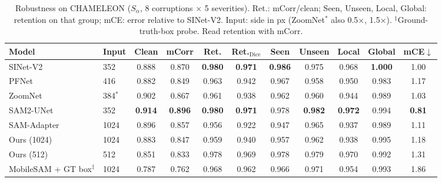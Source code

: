 \begin{table}[t]
\centering
\caption{Robustness on CHAMELEON ($S_\alpha$, 8 corruptions $\times$ 5 severities). Ret.: mCorr/clean; Seen, Unseen, Local, Global: retention on that group; mCE: error relative to SINet-V2. Input: side in px (ZoomNet$^*$ also 0.5$\times$, 1.5$\times$). $^\ddagger$Ground-truth-box probe. Read retention with mCorr.}
\label{tab:robust-chameleon}
\footnotesize
\setlength{\tabcolsep}{4pt}
\begin{tabular}{llccccccccc}
\toprule
Model & Input & Clean & mCorr & Ret. & Ret.$_{\mathrm{Dice}}$ & Seen & Unseen & Local & Global & mCE$\downarrow$ \\
\midrule
SINet-V2 & 352 & 0.888 & 0.870 & \textbf{0.980} & \textbf{0.971} & \textbf{0.986} & 0.975 & 0.968 & \textbf{1.000} & 1.00 \\
PFNet & 416 & 0.882 & 0.849 & 0.963 & 0.942 & 0.967 & 0.958 & 0.950 & 0.983 & 1.17 \\
ZoomNet & 384$^*$ & 0.902 & 0.867 & 0.961 & 0.938 & 0.962 & 0.960 & 0.944 & 0.989 & 1.03 \\
\midrule
SAM2-UNet & 352 & \textbf{0.914} & \textbf{0.896} & \textbf{0.980} & \textbf{0.971} & 0.978 & \textbf{0.982} & \textbf{0.972} & 0.994 & \textbf{0.81} \\
SAM-Adapter & 1024 & 0.896 & 0.857 & 0.956 & 0.922 & 0.947 & 0.965 & 0.937 & 0.989 & 1.11 \\
\midrule
Ours (1024) & 1024 & 0.883 & 0.847 & 0.959 & 0.940 & 0.957 & 0.962 & 0.938 & 0.995 & 1.18 \\
Ours (512) & 512 & 0.851 & 0.833 & 0.978 & 0.969 & 0.978 & 0.979 & 0.970 & 0.992 & 1.31 \\
\midrule
MobileSAM + GT box$^\ddagger$ & 1024 & 0.787 & 0.762 & 0.968 & 0.962 & 0.966 & 0.971 & 0.954 & 0.993 & 1.86 \\
\bottomrule
\end{tabular}
\end{table}

